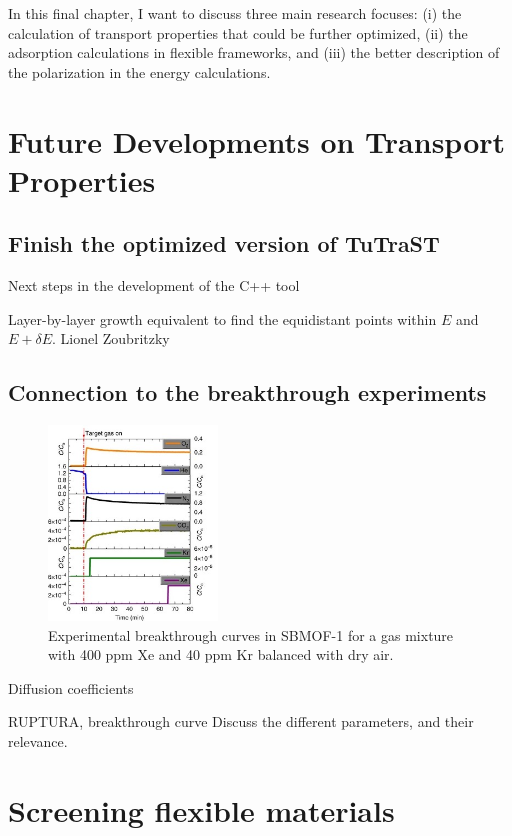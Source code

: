 \documentclass[main]{subfiles}
\begin{document}
In this final chapter, I want to discuss three main research focuses: (i) the calculation of transport properties that could be further optimized, (ii) the adsorption calculations in flexible frameworks, and (iii) the better description of the polarization in the energy calculations.

\section{Future Developments on Transport Properties}

\subsection{Finish the optimized version of TuTraST}

Next steps in the development of the C++ tool

Layer-by-layer growth 
equivalent to find the equidistant points within $E$ and $E+\delta E$. 
Lionel Zoubritzky

\subsection{Connection to the breakthrough experiments}

\begin{figure}[ht]
  \centering
  \includegraphics[width=0.4\textwidth]{figures/6-perspectives/sbmof_breakthrough.jpg}
  \caption{ Experimental breakthrough curves in SBMOF-1 for a gas mixture with 400 ppm Xe and 40 ppm Kr balanced with dry air. }\label{fgr:sbmof_breakthrough}
\end{figure}

Diffusion coefficients 

RUPTURA, breakthrough curve
Discuss the different parameters, and their relevance.

\section{Screening flexible materials}
\end{document}
